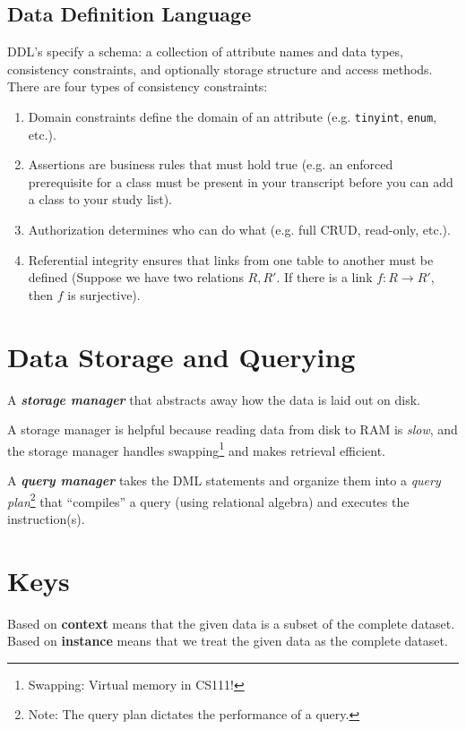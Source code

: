 \documentclass{report}
\newenvironment{definition}[1]{\begin{tcolorbox}[title={Definition: #1}]}{\end{tcolorbox}}
\newenvironment{aside}[1]{\begin{tcolorbox}[title={Aside: #1},colback=blue!5!white,colframe=black!75!blue]}{\end{tcolorbox}}
\renewcommand{\bf}[1]{\textbf{{#1}}}
\renewcommand{\tt}[1]{\texttt{{#1}}}
\renewcommand{\it}[1]{\textit{{#1}}}
\newcommand{\ib}[1]{\textit{\textbf{{#1}}}}
\begin{document}
\subsection{Data Definition Language}
DDL's specify a schema: a collection of attribute names and data types, consistency constraints, and
optionally storage structure and access methods. There are four types of consistency constraints:
\begin{enumerate}[label=\it{(\roman*)}]
    \item Domain constraints define the domain of an attribute (e.g. \tt{tinyint}, \tt{enum}, etc.).
    \item Assertions are business rules that must hold true (e.g. an enforced prerequisite for a 
        class must be present in your transcript before you can add a class to your study list).
    \item Authorization determines who can do what (e.g. full CRUD, read-only, etc.).
    \item Referential integrity ensures that links from one table to another must be defined (Suppose
        we have two relations $R, R'$. If there is a link $f : R \to R'$, then $f$ is surjective).
\end{enumerate}

\section{Data Storage and Querying}
\begin{definition}{Storage Manager}
    A \ib{storage manager} that abstracts away how the data is laid out on disk.
\end{definition}
A storage manager is helpful because reading data from disk to RAM is \it{slow}, and the storage
manager handles swapping\footnote{Swapping: Virtual memory in CS111!} and makes retrieval efficient.

\begin{definition}{Query Manager}
    A \ib{query manager} takes the DML statements and organize them into a 
    \it{query plan}\footnote{Note: The query plan dictates the performance of a query.} that 
    ``compiles'' a query (using relational algebra) and executes the instruction(s).
\end{definition}

\section{Keys}
\begin{aside}{A Note on Context and Instance}
    Based on \bf{context} means that the given data is a subset of the complete dataset.
    \newline
    Based on \bf{instance} means that we treat the given data as the complete dataset.
\end{aside}
\end{document}
